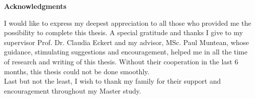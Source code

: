 \clearemptydoublepage
{}
{}	



\vspace*{2cm}

\begin{center}
{\Large \bf Acknowledgments}
\end{center}

\vspace{1cm}




I would like to express my deepest appreciation to all those who provided me the possibility to complete this thesis. A special gratitude and thanks I give to my supervisor Prof. Dr. Claudia Eckert and my advisor, MSc. Paul Muntean, whose guidance, stimulating suggestions and encouragement, helped me in all the time of research and writing of this thesis. Without their cooperation in the last 6 months, this thesis could not be done smoothly.\\ 
Last but not the least, I wish to thank my family for their support and encouragement throughout my Master study.